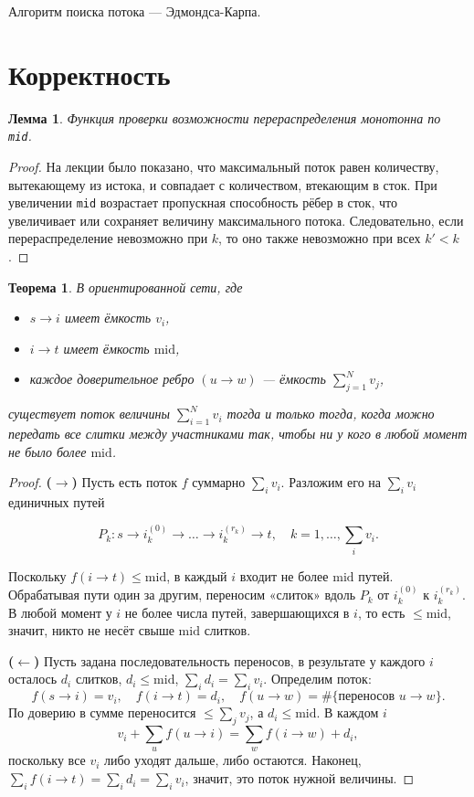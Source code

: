 \documentclass{article}
\newtheorem{lemma}{Лемма}  %
\newtheorem{theorem}{Теорема}  %
\renewcommand{\le}{\leqslant}   %
\begin{document}
Алгоритм поиска потока — Эдмондса-Карпа.

\section{Корректность}

\begin{lemma}
    Функция проверки возможности перераспределения монотонна по \texttt{mid}.
\end{lemma}

\begin{proof}
    На лекции было показано, что максимальный поток равен количеству, вытекающему из истока, и совпадает с количеством, втекающим в сток.
    При увеличении \texttt{mid} возрастает пропускная способность рёбер в сток, что увеличивает или сохраняет величину максимального потока. Следовательно, если перераспределение невозможно при $k$, то оно также невозможно при всех $k' < k$.
\end{proof}

\begin{theorem}
    В ориентированной сети, где
    \begin{itemize}
        \item \(s\to i\) имеет ёмкость \(v_i\),
        \item \(i\to t\) имеет ёмкость \(\mathrm{mid}\),
        \item каждое доверительное ребро \((u\to w)\) — ёмкость \(\sum_{j=1}^N v_j\),
    \end{itemize}
    существует поток величины $ \sum_{i=1}^N v_i $
    тогда и только тогда, когда можно передать все слитки между участниками так, чтобы ни у кого в любой момент не было более \(\mathrm{mid}\).
\end{theorem}

\begin{proof}
    \textbf{($\rightarrow$)} Пусть есть поток \(f\) суммарно \(\sum_i v_i\). Разложим его на \(\sum_i v_i\) единичных путей

    $$
        P_k: s \to i_k^{(0)} \to \dots \to i_k^{(r_k)} \to t,\quad k=1,\dots,\sum_i v_i.
    $$

    Поскольку \(f(i\to t)\le\mathrm{mid}\), в каждый \(i\) входит не более \(\mathrm{mid}\) путей. Обрабатывая пути один за другим, переносим «слиток» вдоль \(P_k\) от \(i_k^{(0)}\) к \(i_k^{(r_k)}\). В любой момент у \(i\) не более числа путей, завершающихся в \(i\), то есть \(\le\mathrm{mid}\), значит, никто не несёт свыше \(\mathrm{mid}\) слитков.

    \textbf{($\leftarrow$)} Пусть задана последовательность переносов, в результате у каждого \(i\) осталось \(d_i\) слитков, \(d_i\le\mathrm{mid}\), \(\sum_i d_i=\sum_i v_i\). Определим поток:
    \[
        f(s\to i)=v_i,\quad
        f(i\to t)=d_i,\quad
        f(u\to w)=\#\{\text{переносов }u\to w\}.
    \]
    По доверию в сумме переносится \(\le\sum_j v_j\), а \(d_i\le\mathrm{mid}\). В каждом \(i\)
    \[
        v_i+\sum_{u}f(u\to i)=\sum_{w}f(i\to w)+d_i,
    \]
    поскольку все \(v_i\) либо уходят дальше, либо остаются. Наконец, \(\sum_i f(i\to t)=\sum_i d_i=\sum_i v_i\), значит, это поток нужной величины.
\end{proof}
\end{document}
